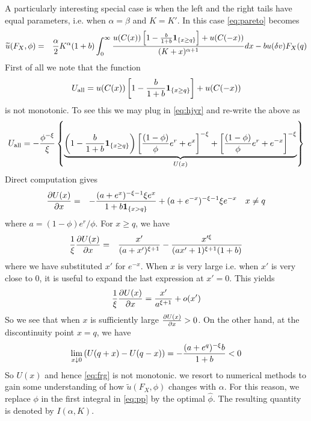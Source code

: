 \documentclass[11pt,a4]{amsart}
\newcommand{\pd}{\partial}
\newcommand{\wt}{\widetilde}
\newcommand{\1}{{\mathbf 1}}
\begin{document}
\par
A particularly interesting special case is when the left and the right
tails have equal parameters, i.e. when $\alpha = \beta$ and $K =
K'$. In this case \eqref{eq:pareto} becomes
\begin{eqnarray}
  \wt u(F_X, \phi) &=& {\alpha \over 2} K^\alpha (1 + b)
  \int_{0}^\infty {
    u(C(x)) \left[
      1 - {b \over 1 + b}\1_{\{x \ge q\}}
      \right]
    + u(C(-x))
    \over
    (K + x)^{\alpha + 1}
  } dx
  - b u(\delta v) F_X(q)
  \label{eq:ipf}
\end{eqnarray}
First of all we note that the function
\[
U_{\text{all}} =
u(C(x)) \left[
  1 - {b \over 1 + b}\1_{\{x \ge q\}}
  \right]
+ u(C(-x))
\]
is not monotonic. To see this we may plug in \eqref{eq:hjyr} and
re-write the above as
\begin{equation}
U_{\text{all}} =
  -{\phi^{-\xi} \over \xi} \left\{
  \underbrace{
    \left(1 - {b \over 1 + b}\1_{\{x \ge q\}}\right)
    \left[{(1 - \phi) \over \phi} e^r + e^x\right]^{-\xi}
    +
    \left[{(1 - \phi) \over \phi} e^r + e^{-x}\right]^{-\xi}
  }_{U(x)} \right\}
  \label{eq:frg}
\end{equation}
Direct computation gives
\begin{eqnarray*}
  {\pd U(x) \over \pd x}
  &=&
  -{
    (a + e^x)^{-\xi - 1} \xi e^x
    \over
    1 + b \1_{\{x > q\}}
  } + (a + e^{-x})^{-\xi - 1} \xi e^{-x}
  \quad x \neq q
\end{eqnarray*}
where $a = (1 - \phi) e^r/\phi$. For $x \ge q$, we have
\begin{eqnarray*}
  {1 \over \xi}
  {\pd U(x) \over \pd x} &=& {x' \over (a + x')^{\xi + 1}}
  - {x'^\xi \over (a x' + 1)^{\xi + 1} (1 + b)}
\end{eqnarray*}
where we have substituted $x'$ for $e^{-x}$. When $x$ is very large
i.e. when $x'$ is very close to 0, it is useful to expand the last
expression at $x' = 0$. This yields
\[
  {1 \over \xi}
  {\pd U(x) \over \pd x}
  = {x' \over a^{\xi + 1}} + o(x')
\]
So we see that when $x$ is sufficiently large
${\pd U(x) \over \pd x} > 0$. On the other hand, at the discontinuity
point $x = q$, we have
\[
\lim_{x \downarrow 0} \left(
  U(q + x) - U(q - x)
\right)
= - {
  (a + e^q)^{-\xi} b
  \over
  1+ b
} < 0
\]
So $U(x)$ and hence \eqref{eq:frg} is not monotonic. we resort to
numerical methods to gain some understanding of how $\tilde u(F_X,
\phi)$ changes with $\alpha$.
For this reason, we replace $\phi$ in the first integral in
\eqref{eq:pp} by the optimal $\hat\phi$. The resulting quantity is
denoted by $I(\alpha, K)$.
\end{document}
